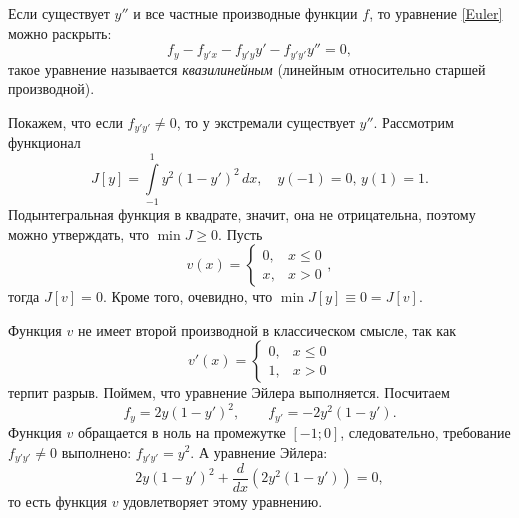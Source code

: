 \documentclass[12pt,a5paper]{book}
\begin{document}
	Если существует $y''$ и все частные производные функции $f$, то уравнение \eqref{Euler} можно раскрыть:
	\begin{equation}\label{quasy_Euler}
		f_y - f_{y'x} - f_{y'y}y' - f_{y'y'}y'' = 0,
	\end{equation}
	такое уравнение называется \emph{квазилинейным} (линейным относительно старшей производной).
	
	Покажем, что если $f_{y'y'} \neq 0$, то у экстремали существует $y''$. Рассмотрим функционал
	\begin{equation*}
		J[y] = \int\limits_{-1}^1 y^2(1 - y')^2\,dx, \quad y(-1) = 0,\, y(1) = 1.
	\end{equation*}
	Подынтегральная функция в квадрате, значит, она не отрицательна, поэтому можно утверждать, что $\min{J} \geq 0$. Пусть
	\begin{equation*}
		v(x) = \begin{cases}
			0, & x \leq 0 \\
			x, & x > 0
		\end{cases},
	\end{equation*}
	тогда $J[v] = 0$. Кроме того, очевидно, что $\min{J}[y] \equiv 0 = J[v]$.
	
	Функция $v$ не имеет второй производной в классическом смысле, так как
	\begin{equation*}
		v'(x) = \begin{cases}
			0, & x \leq 0 \\
			1, & x > 0
		\end{cases}
	\end{equation*}
	терпит разрыв. Поймем, что уравнение Эйлера выполняется. Посчитаем
	\begin{equation*}
		f_y = 2y(1-y')^2, \qquad f_{y'} = -2y^2(1-y').
	\end{equation*}
	Функция $v$ обращается в ноль на промежутке $[-1;0]$, следовательно, требование $f_{y'y'} \neq 0$ выполнено: $f_{y'y'} = y^2$. А уравнение Эйлера:
	\begin{equation*}
		2y\left(1-y'\right)^2 + \frac{d}{dx}\left(2y^2(1-y')\right) = 0,
	\end{equation*}
	то есть функция $v$ удовлетворяет этому уравнению.
	
\end{document}
